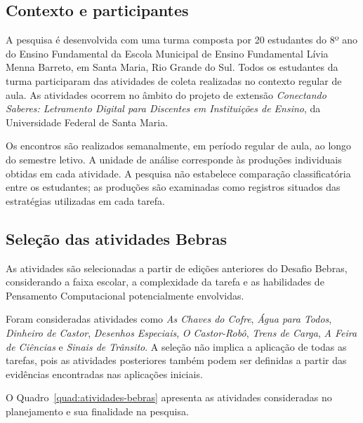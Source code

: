 \subsection{Contexto e participantes}

A pesquisa é desenvolvida com uma turma composta por 20 estudantes do 8º ano do Ensino Fundamental da Escola Municipal de Ensino Fundamental Lívia Menna Barreto, em Santa Maria, Rio Grande do Sul. Todos os estudantes da turma participaram das atividades de coleta realizadas no contexto regular de aula. As atividades ocorrem no âmbito do projeto de extensão \textit{Conectando Saberes: Letramento Digital para Discentes em Instituições de Ensino}, da Universidade Federal de Santa Maria.

Os encontros são realizados semanalmente, em período regular de aula, ao longo do semestre letivo. A unidade de análise corresponde às produções individuais obtidas em cada atividade. A pesquisa não estabelece comparação classificatória entre os estudantes; as produções são examinadas como registros situados das estratégias utilizadas em cada tarefa.

\subsection{Seleção das atividades Bebras}

As atividades são selecionadas a partir de edições anteriores do
Desafio Bebras, considerando a faixa escolar, a complexidade da tarefa e as habilidades de Pensamento Computacional potencialmente envolvidas.

Foram consideradas atividades como \textit{As Chaves do Cofre},
\textit{Água para Todos}, \textit{Dinheiro de Castor},
\textit{Desenhos Especiais}, \textit{O Castor-Robô},
\textit{Trens de Carga}, \textit{A Feira de Ciências} e
\textit{Sinais de Trânsito}. A seleção não implica a aplicação de
todas as tarefas, pois as atividades posteriores também podem ser
definidas a partir das evidências encontradas nas aplicações iniciais.

O Quadro~\ref{quad:atividades-bebras} apresenta as atividades
consideradas no planejamento e sua finalidade na pesquisa.

